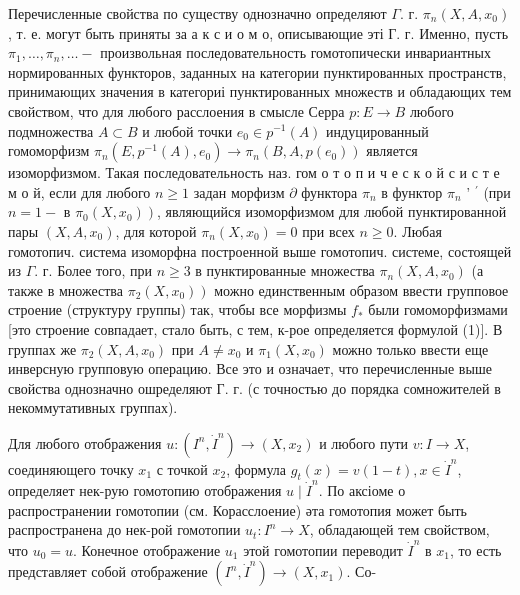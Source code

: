 \documentclass[10pt]{article}
\begin{document}
Перечисленные свойства по существу однозначно определяют $\Gamma$. г. $\pi_{n}\left(X, A, x_{0}\right)$, т. е. могут быть приняты за а к с и о м о, описывающие эті Г. г. Именно, пусть $\pi_{1}, \ldots, \pi_{n}, \ldots-$ произвольная последовательность гомотопически инвариантных нормированных функторов, заданных на категории пунктированных пространств, принимающих значения в категориі пунктированных множеств и обладающих тем свойством, что для любого расслоения в смысле Серра $p: E \rightarrow B$ любого подмножества $A \subset B$ и любой точки $e_{0} \in p^{-1}(A)$ индуцированный гомоморфизм $\pi_{n}\left(E, p^{-1}(A), e_{0}\right) \rightarrow \pi_{n}\left(B, A, p\left(e_{0}\right)\right)$ является изоморфизмом. Такая последовательность наз. гом о т о п и ч е с к о й с и с т е м о й, если для любого $n \geqslant 1$ задан морфизм $\partial$ функтора $\pi_{n}$ в функтор $\pi_{n}$ ' $^{\prime}$ (при $n=1-$ в $\left.\pi_{0}\left(X, x_{0}\right)\right)$, являющийся изоморфизмом для любой пунктированной пары $\left(X, A, x_{0}\right)$, для которой $\pi_{n}\left(X, x_{0}\right)=0$ при всех $n \geqslant 0$. Любая гомотопич. система изоморфна построенной выше гомотопич. системе, состоящей из $\Gamma$. г. Более того, при $n \geqslant 3$ в пунктированные множества $\pi_{n}\left(X, A, x_{0}\right)$ (а также в множества $\left.\pi_{2}\left(X, x_{0}\right)\right)$ можно единственным образом ввести групповое строение (структуру группы) так, чтобы все морфизмы $f_{*}$ были гомоморфизмами [это строение совпадает, стало быть, с тем, к-рое определяется формулой (1)]. В группах же $\pi_{2}\left(X, A, x_{0}\right)$ при $A \neq x_{0}$ и $\pi_{1}\left(X, x_{0}\right)$ можно только ввести еще инверсную групповую операцию. Все это и означает, что перечисленные выше свойства однозначно ошределяют Г. г. (с точностью до порядка сомножителей в некоммутативных группах).



Для любого отображения $u:\left(I^{n}, \dot{I}^{n}\right) \rightarrow\left(X, x_{2}\right)$ и любого пути $v: I \rightarrow X$, соединяющего точку $x_{1}$ с точкой $x_{2}$, формула $g_{t}(x)=v(1-t), x \in \dot{I}^{n}$, определяет нек-рую гомотопию отображения $u \mid \dot{I}^{n}$. По аксіоме о распространении гомотопии (см. Корасслоение) әта гомотопия может быть распространена до нек-рой гомотопии $u_{t}: I^{n} \rightarrow X$, обладающей тем свойством, что $u_{0}=u$. Конечное отображение $u_{1}$ этой гомотопии переводит $\dot{I}^{n}$ в $x_{1}$, то есть представляет собой отображение $\left(I^{n}, \dot{I}^{n}\right) \rightarrow\left(X, x_{1}\right)$. Со-
\end{document}

